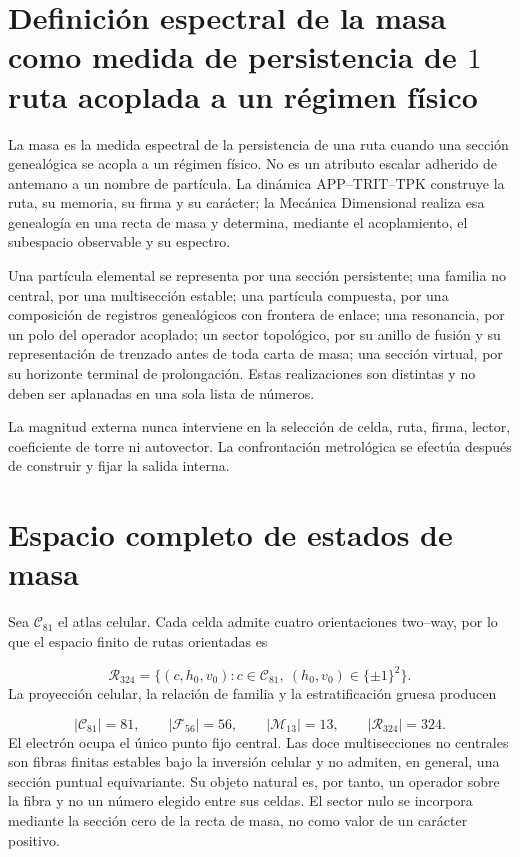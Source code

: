 \section{Definición espectral de la masa como medida de persistencia de \(1\) ruta acoplada a un régimen físico}
La masa es la medida espectral de la persistencia de una ruta cuando una sección genealógica se acopla a un régimen físico. No es un atributo escalar adherido de antemano a un nombre de partícula. La dinámica APP--TRIT--TPK construye la ruta, su memoria, su firma y su carácter; la Mecánica Dimensional realiza esa genealogía en una recta de masa y determina, mediante el acoplamiento, el subespacio observable y su espectro.

Una partícula elemental se representa por una sección persistente; una familia no central, por una multisección estable; una partícula compuesta, por una composición de registros genealógicos con frontera de enlace; una resonancia, por un polo del operador acoplado; un sector topológico, por su anillo de fusión y su representación de trenzado antes de toda carta de masa; una sección virtual, por su horizonte terminal de prolongación. Estas realizaciones son distintas y no deben ser aplanadas en una sola lista de números.

La magnitud externa nunca interviene en la selección de celda, ruta, firma, lector, coeficiente de torre ni autovector. La confrontación metrológica se efectúa después de construir y fijar la salida interna.

\section{Espacio completo de estados de masa}
Sea \(\mathcal C_{81}\) el atlas celular. Cada celda admite cuatro orientaciones two--way, por lo que el espacio finito de rutas orientadas es

\[
 \mathcal R_{324}
 =\{(c,h_0,v_0):c\in\mathcal C_{81},\ (h_0,v_0)\in\{\pm1\}^2\}.
\]
La proyección celular, la relación de familia y la estratificación gruesa producen

\[
 |\mathcal C_{81}|=81,\qquad
 |\mathcal F_{56}|=56,\qquad
 |\mathcal M_{13}|=13,\qquad
 |\mathcal R_{324}|=324.
\]
El electrón ocupa el único punto fijo central. Las doce multisecciones no centrales son fibras finitas estables bajo la inversión celular y no admiten, en general, una sección puntual equivariante. Su objeto natural es, por tanto, un operador sobre la fibra y no un número elegido entre sus celdas. El sector nulo se incorpora mediante la sección cero de la recta de masa, no como valor de un carácter positivo.

